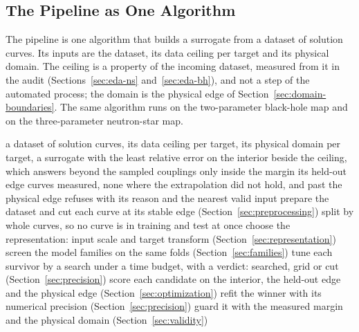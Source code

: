 \subsection{The Pipeline as One Algorithm}
\label{sec:algorithm}

The pipeline is one algorithm that builds a surrogate from a dataset of solution curves. Its inputs are the dataset, its data ceiling per target and its physical domain. The ceiling is a property of the incoming dataset, measured from it in the audit (Sections~\ref{sec:eda-ns} and~\ref{sec:eda-bh}), and not a step of the automated process; the domain is the physical edge of Section~\ref{sec:domain-boundaries}. The same algorithm runs on the two-parameter black-hole map and on the three-parameter neutron-star map.

\begin{algorithm}[!htb]
\caption{Building a surrogate of a compact-object map.}
\label{alg:surrogate}
\begin{algorithmic}[1]
\Require a dataset of solution curves, its data ceiling per target, its physical domain
\Ensure per target, a surrogate with the least relative error on the interior beside the ceiling, which answers beyond the sampled couplings only inside the margin its held-out edge curves measured, none where the extrapolation did not hold, and past the physical edge refuses with its reason and the nearest valid input
\State prepare the dataset and cut each curve at its stable edge (Section~\ref{sec:preprocessing})
\State split by whole curves, so no curve is in training and test at once
\State choose the representation: input scale and target transform (Section~\ref{sec:representation})
\State screen the model families on the same folds (Section~\ref{sec:families})
\State tune each survivor by a search under a time budget, with a verdict: searched, grid or cut (Section~\ref{sec:precision})
\State score each candidate on the interior, the held-out edge and the physical edge (Section~\ref{sec:optimization})
\State refit the winner with its numerical precision (Section~\ref{sec:precision})
\State guard it with the measured margin and the physical domain (Section~\ref{sec:validity})
\end{algorithmic}
\end{algorithm}

